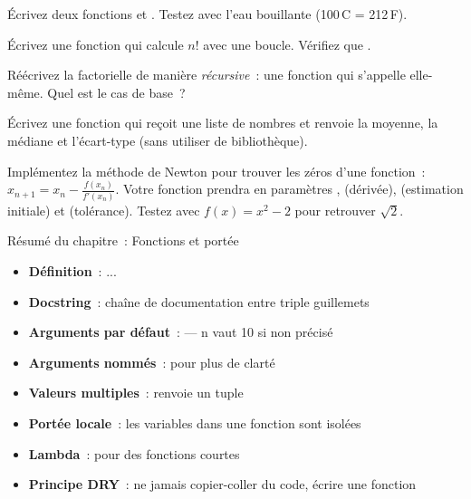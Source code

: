\begin{exercice}
\'Ecrivez deux fonctions  et .
Testez avec l'eau bouillante (100\,\textdegree C = 212\,\textdegree F).
\end{exercice}

\begin{exercice}
\'Ecrivez une fonction  qui calcule $n!$ avec une boucle.
V\'erifiez que .
\end{exercice}

\begin{exercice}
R\'e\'ecrivez la factorielle de mani\`ere \emph{r\'ecursive}~: une fonction qui
s'appelle elle-m\^eme. Quel est le cas de base~?
\end{exercice}

\begin{exercice}
\'Ecrivez une fonction  qui re\c{c}oit une liste de nombres
et renvoie la moyenne, la m\'ediane et l'\'ecart-type (sans utiliser de biblioth\`eque).
\end{exercice}

\begin{exercice}
Impl\'ementez la m\'ethode de Newton pour trouver les z\'eros
d'une fonction~: $x_{n+1} = x_n - \frac{f(x_n)}{f'(x_n)}$.
Votre fonction prendra en param\`etres ,  (d\'eriv\'ee), 
(estimation initiale) et  (tol\'erance). Testez avec
$f(x) = x^2 - 2$ pour retrouver $\sqrt{2}$.
\end{exercice}

\begin{formules}{R\'esum\'e du chapitre~: Fonctions et port\'ee}
\begin{itemize}
    \item \textbf{D\'efinition}~:  ... 
    \item \textbf{Docstring}~: cha\^ine de documentation entre triple guillemets
    \item \textbf{Arguments par d\'efaut}~:  --- n vaut 10 si non pr\'ecis\'e
    \item \textbf{Arguments nomm\'es}~:  pour plus de clart\'e
    \item \textbf{Valeurs multiples}~:  renvoie un tuple
    \item \textbf{Port\'ee locale}~: les variables dans une fonction sont isol\'ees
    \item \textbf{Lambda}~:  pour des fonctions courtes
    \item \textbf{Principe DRY}~: ne jamais copier-coller du code, \'ecrire une fonction
\end{itemize}
\end{formules}
